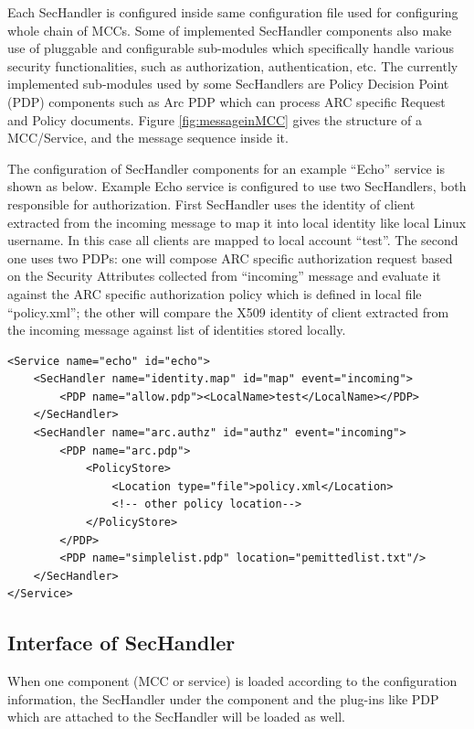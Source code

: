 \documentclass{article}                            %
\begin{document}
Each SecHandler is configured inside same configuration file used for configuring whole chain of MCCs. Some of implemented SecHandler components also make use of pluggable and configurable sub-modules which specifically handle various security functionalities, such as authorization, authentication, etc. The currently implemented sub-modules used by some SecHandlers are Policy Decision Point (PDP) components such as Arc PDP which can process ARC specific Request and Policy documents. Figure \ref{fig:messageinMCC} gives the structure of a MCC/Service, and the message sequence inside it.

The configuration of SecHandler components for an example ``Echo'' service is shown as below. Example Echo service is configured to use two SecHandlers, both responsible for authorization. First SecHandler uses the identity of client extracted from the incoming message to map it into local identity like local Linux username. In this case all clients are mapped to local account “test”. The second one uses two PDPs: one will compose ARC specific authorization request based on the Security Attributes collected from “incoming” message and evaluate it against the ARC specific authorization policy which is defined in local file “policy.xml”; the other will compare the X509 identity of client extracted from the incoming message against list of identities stored locally.

\begin{verbatim}
<Service name="echo" id="echo">
    <SecHandler name="identity.map" id="map" event="incoming">
        <PDP name="allow.pdp"><LocalName>test</LocalName></PDP>
    </SecHandler>
    <SecHandler name="arc.authz" id="authz" event="incoming">
        <PDP name="arc.pdp">
            <PolicyStore>
                <Location type="file">policy.xml</Location>
                <!-- other policy location-->
            </PolicyStore>
        </PDP>
        <PDP name="simplelist.pdp" location="pemittedlist.txt"/>
    </SecHandler>
</Service>
\end{verbatim}


\subsection{Interface of SecHandler} %
\label{subsec:interface_sechandler}

When one component (MCC or service) is loaded according to the configuration information, the SecHandler under the component and the plug-ins like PDP which are attached to the SecHandler will be loaded as well.
\end{document}
